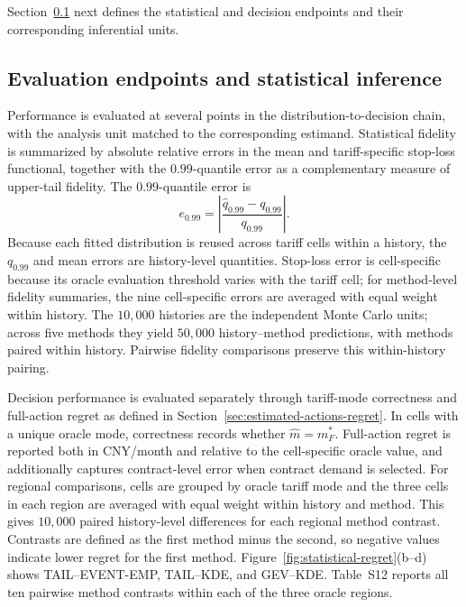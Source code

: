 \documentclass[Times1COL]{WileyNJDv5}
\begin{document}
Section~\ref{sec:evaluation-inference} next defines the statistical and decision endpoints and their corresponding inferential units.

\subsection{Evaluation endpoints and statistical inference}
\label{sec:evaluation-inference}

Performance is evaluated at several points in the distribution-to-decision
chain, with the analysis unit matched to the corresponding estimand.
Statistical fidelity is summarized by absolute relative errors in the
mean and tariff-specific stop-loss functional, together with the
$0.99$-quantile error as a complementary measure of upper-tail fidelity.
The $0.99$-quantile error is
\begin{equation}
\label{eq:quantile-error}
e_{0.99}
=
\left|
\frac{\widehat q_{0.99}-q_{0.99}}{q_{0.99}}
\right|.
\end{equation}
Because each fitted distribution is reused across tariff cells within a
history, the $q_{0.99}$ and mean errors are history-level quantities.
Stop-loss error is cell-specific because its oracle evaluation threshold
varies with the tariff cell; for method-level fidelity summaries, the nine
cell-specific errors are averaged with equal weight within history. The
$10{,}000$ histories are the independent Monte Carlo units; across five
methods they yield $50{,}000$ history--method predictions, with methods
paired within history. Pairwise fidelity comparisons preserve this
within-history pairing.

Decision performance is evaluated separately through tariff-mode correctness and full-action regret as defined in Section~\ref{sec:estimated-actions-regret}. In cells with a unique oracle mode, correctness records whether $\widehat m=m_F^\ast$. Full-action regret is reported both in CNY/month and relative to the cell-specific oracle value, and additionally captures contract-level error when contract demand is selected. For regional comparisons, cells are grouped by oracle tariff mode and
the three cells in each region are averaged with equal weight within
history and method. This gives $10{,}000$ paired history-level
differences for each regional method contrast. Contrasts are defined
as the first method minus the second, so negative values indicate
lower regret for the first method.
Figure~\ref{fig:statistical-regret}(b--d) shows
TAIL--EVENT-EMP, TAIL--KDE, and GEV--KDE. Table~S12 reports all ten
pairwise method contrasts within each of the three oracle regions.
\end{document}
